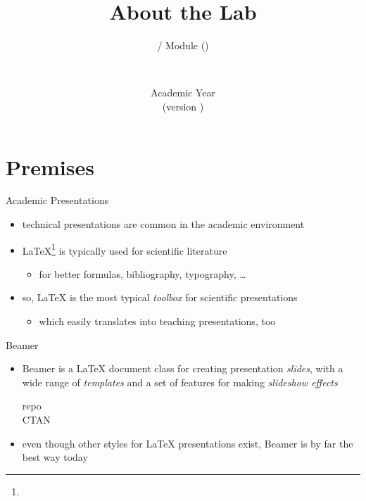 \documentclass[presentation]{beamer}\mode<presentation>{\usetheme{AMSBolognaFC}}
\title[\currentLab{} -- About]{About the Lab}
\subtitle{\courseName{} / Module \moduleN{} (\courseAcronym)}
\author[\sspeaker{\gcShort}]{\speaker{\gcFull} \\ \gcEmail}
\institute[\disiShort, \uniboShort]{\disi{} (\disiShort)\\\unibo}
\date[A.Y. \academicYear{} (v.\ \version)]{Academic Year \academicYear{}\\(version \version)}
\begin{document}

\frame{\titlepage}

%

\section{Premises}

\begin{frame}[c]{Academic Presentations}
%
\begin{itemize}
	\item technical presentations are common in the academic environment
	\item \alert{\LaTeX{}}\footnote{} is typically used for scientific literature
	\begin{itemize}
		\item for better formulas, bibliography, typography, \ldots
	\end{itemize}
	\item so, \LaTeX{} is the most typical \emph{toolbox} for scientific presentations
	\begin{itemize}
		\item which easily translates into teaching presentations, too
	\end{itemize}
\end{itemize}
%
\end{frame}

\begin{frame}[c]{Beamer}
%
\begin{itemize}
	\item \alert{Beamer} is a \LaTeX{} document class for creating presentation \emph{slides}, with a wide range of \emph{templates} and a set of features for making \emph{slideshow effects}
	\begin{description}
		\item[repo] 
		\item[CTAN] 
	\end{description}
	\item even though other styles for \LaTeX{} presentations exist, Beamer is by far the best way today
\end{itemize}
%
\end{frame}
\end{document}
